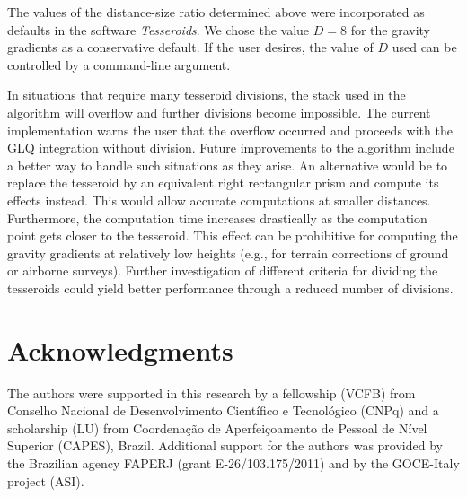 The values of the distance-size ratio determined above were
incorporated as defaults in the software \emph{Tesseroids}.
We chose the value $D=8$ for the gravity gradients as a conservative default.
If the user desires, the value of $D$ used can be controlled by a command-line
argument.


In situations that require many tesseroid divisions,
the stack used in the algorithm will overflow and further
divisions become impossible.
The current implementation warns the user that
the overflow occurred and proceeds with the GLQ integration without division.
Future improvements to the algorithm include a better way to handle such
situations as they arise.
An alternative would be to replace the tesseroid by an equivalent
right rectangular prism and compute its effects instead.
This would allow accurate computations at smaller distances.
Furthermore,
the computation time increases drastically as the computation point
gets closer to the tesseroid.
This effect can be prohibitive for computing the gravity gradients at
relatively low heights (e.g., for terrain corrections of
ground or airborne surveys).
Further investigation of different criteria for dividing the tesseroids could
yield better performance through a reduced number of divisions.


\section{Acknowledgments}

The authors were supported in this research by
a fellowship (VCFB) from
Conselho Nacional de Desenvolvimento Cient\'ifico e Tecnol\'ogico (CNPq)
and a scholarship (LU) from
Coordena\c{c}\~ao de Aperfei\c{c}oamento de Pessoal de N\'ivel Superior
(CAPES),
Brazil.
Additional support for the authors was provided by
the Brazilian agency FAPERJ (grant E-26/103.175/2011)
and by the GOCE-Italy project (ASI).
